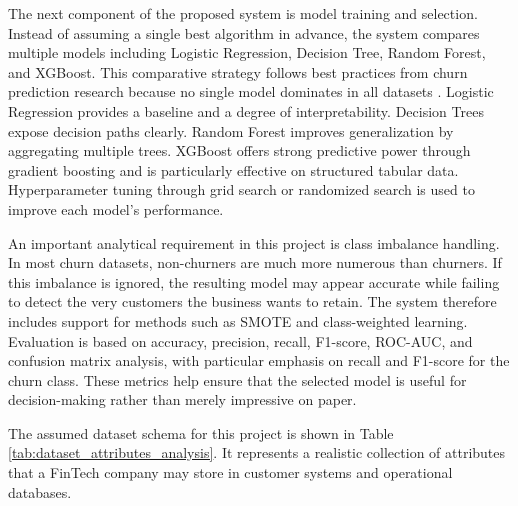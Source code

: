 The next component of the proposed system is model training and selection. Instead of assuming a single best algorithm in advance, the system compares multiple models including Logistic Regression, Decision Tree, Random Forest, and XGBoost. This comparative strategy follows best practices from churn prediction research because no single model dominates in all datasets \cite{systematicreview,imani2024}. Logistic Regression provides a baseline and a degree of interpretability. Decision Trees expose decision paths clearly. Random Forest improves generalization by aggregating multiple trees. XGBoost offers strong predictive power through gradient boosting and is particularly effective on structured tabular data. Hyperparameter tuning through grid search or randomized search is used to improve each model’s performance.

An important analytical requirement in this project is class imbalance handling. In most churn datasets, non-churners are much more numerous than churners. If this imbalance is ignored, the resulting model may appear accurate while failing to detect the very customers the business wants to retain. The system therefore includes support for methods such as SMOTE and class-weighted learning. Evaluation is based on accuracy, precision, recall, F1-score, ROC-AUC, and confusion matrix analysis, with particular emphasis on recall and F1-score for the churn class. These metrics help ensure that the selected model is useful for decision-making rather than merely impressive on paper.

The assumed dataset schema for this project is shown in Table \ref{tab:dataset_attributes_analysis}. It represents a realistic collection of attributes that a FinTech company may store in customer systems and operational databases.

